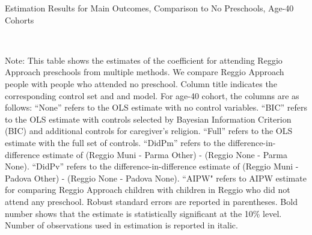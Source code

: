 \begin{table}[H] \caption{Estimation Results for Main Outcomes, Comparison to No Preschools, Age-40 Cohorts} \label{ols-M-adult40-reg-nopres}
\scalebox{0.65}{}
\vspace{1ex} \\
\footnotesize\raggedright{Note: This table shows the estimates of the coefficient for attending Reggio Approach preschools from multiple methods. We compare Reggio Approach people with people who attended no preschool. Column title indicates the corresponding control set and and model. For age-40 cohort, the columns are as follows: ``None'' refers to the OLS estimate with no control variables. ``BIC'' refers to the OLS estimate with controls selected by Bayesian Information Criterion (BIC) and additional controls for caregiver's religion. ``Full'' refers to the OLS estimate with the full set of controls. ``DidPm'' refers to the difference-in-difference estimate of (Reggio Muni - Parma Other) - (Reggio None - Parma None). ``DidPv'' refers to the difference-in-difference estimate of (Reggio Muni - Padova Other) - (Reggio None - Padova None).  ``AIPW" refers to AIPW estimate for comparing Reggio Approach children with children in Reggio who did not attend any preschool. Robust standard errors are reported in parentheses. Bold number shows that the estimate is statistically significant at the 10\% level. Number of observations used in estimation is reported in italic.}
\end{table}

